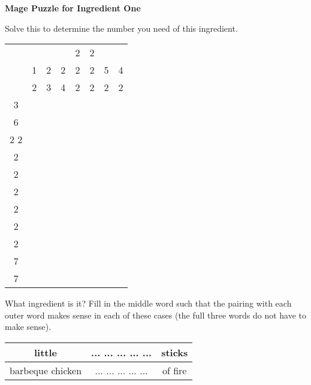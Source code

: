 \documentclass[white]{guildcamp3}
\begin{document}
\name{\wMagePuzzleOne{}} %

\large\textbf{Mage Puzzle for Ingredient One}  

Solve this to determine the number you need of this ingredient. 


\begin{tabular}{|c|c|c|c|c|c|c|c|}
	\hline \rule[-2ex]{0pt}{5.5ex}  &  &  &  & 2 & 2 &  &  \\ 
	  & 1 & 2 & 2 & 2 & 2 & 5 & 4 \\ 
      & 2 & 3 & 4 & 2 & 2 & 2 & 2 \\ 
	\hline \rule[-2ex]{0pt}{5.5ex} 3 &  &  &  &  &  &  &  \\ 
	\hline \rule[-2ex]{0pt}{5.5ex} 6 &  &  &  &  &  &  &  \\ 
	\hline \rule[-2ex]{0pt}{5.5ex} 2 2 &  &  &  &  &  &  &  \\ 
	\hline \rule[-2ex]{0pt}{5.5ex} 2 &  &  &  &  &  &  &  \\ 
	\hline \rule[-2ex]{0pt}{5.5ex} 2 &  &  &  &  &  &  &  \\ 
	\hline \rule[-2ex]{0pt}{5.5ex} 2 &  &  &  &  &  &  &  \\ 
	\hline \rule[-2ex]{0pt}{5.5ex} 2 &  &  &  &  &  &  &  \\ 
	\hline \rule[-2ex]{0pt}{5.5ex} 2 &  &  &  &  &  &  &  \\ 
	\hline \rule[-2ex]{0pt}{5.5ex} 2 &  &  &  &  &  &  &  \\ 
	\hline \rule[-2ex]{0pt}{5.5ex} 7 &  &  &  &  &  &  &  \\ 
	\hline \rule[-2ex]{0pt}{5.5ex} 7 &  &  &  &  &  &  &  \\ 
	\hline 
\end{tabular} 

What ingredient is it? Fill in the middle word such that the pairing with each outer word makes sense in each of these cases (the full three words do not have to make sense).

\begin{tabular}{|c|c|c|}
	\hline \rule[-2ex]{0pt}{5.5ex} little & ... ... ... ... ... & sticks \\ 
	\hline \rule[-2ex]{0pt}{5.5ex} barbeque chicken & ... ... ... ... ... & of fire \\ 
	\hline 
\end{tabular} 
\end{document}

